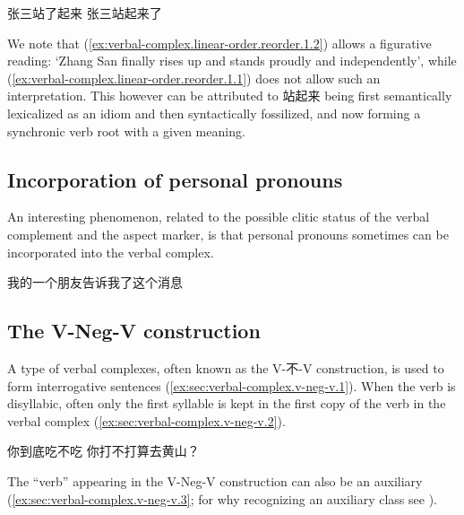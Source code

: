 \documentclass[UTF8, a4paper, oneside, scheme=plain, 12pt]{ctexrep}
\newcommand{\translate}[1]{`#1'}
\begin{document}
\begin{exe}
    \ex\label{ex:verbal-complex.linear-order.reorder.1} \begin{xlist}
        \ex\label{ex:verbal-complex.linear-order.reorder.1.1} 张三站了起来
        \ex\label{ex:verbal-complex.linear-order.reorder.1.2} 张三站起来了
    \end{xlist}
\end{exe}

We note that (\ref{ex:verbal-complex.linear-order.reorder.1.2}) allows a figurative reading:
\translate{Zhang San finally rises up and stands proudly and independently},
while (\ref{ex:verbal-complex.linear-order.reorder.1.1})
does not allow such an interpretation.
This however can be attributed to 站起来 being first semantically lexicalized as an idiom
and then syntactically fossilized,
and now forming a synchronic verb root with a given meaning.

\subsection{Incorporation of personal pronouns}\label{sec:verbal-complex.v-c-a.incorporation}

An interesting phenomenon, related to the possible clitic status of the verbal complement and the aspect marker,
is that personal pronouns sometimes can be incorporated into the verbal complex.

\begin{exe}
    \ex 我的一个朋友告诉我了这个消息
\end{exe}

\subsection{The V-Neg-V construction}\label{sec:verbal-complex.v-neg-v}

A type of verbal complexes, often known as the V-不-V construction,
is used to form interrogative sentences
(\ref{ex:sec:verbal-complex.v-neg-v.1}).
When the verb is disyllabic, often only the first syllable is kept in the first copy of the verb in the verbal complex
(\ref{ex:sec:verbal-complex.v-neg-v.2}).

\begin{exe}
    \ex\label{ex:sec:verbal-complex.v-neg-v.1} 你到底吃不吃
    \ex\label{ex:sec:verbal-complex.v-neg-v.2} 你打不打算去黄山？
\end{exe}

The ``verb'' appearing in the V-Neg-V construction
can also be an auxiliary (\ref{ex:sec:verbal-complex.v-neg-v.3};
for why recognizing an auxiliary class see ).
\end{document}
